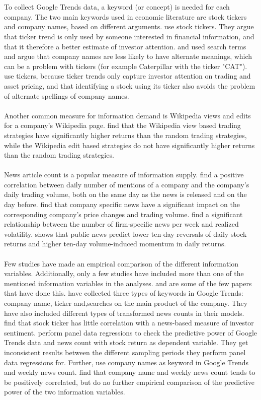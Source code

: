 \\\\
To collect Google Trends data, a keyword (or concept) is needed for each company. The two main keywords used in economic literature are stock tickers and company names, based on different arguments. \cite{joseph} use stock tickers. They argue that ticker trend is only used by someone interested in financial information, and that it therefore a better estimate of investor attention. \cite{bijl} and \cite{vlastakis} used search terms and argue that company names are less likely to have alternate meanings, which can be a problem with tickers (for example Caterpillar with the ticker "CAT"). \cite{engelberg} use tickers, because ticker trends only capture investor attention on trading and asset pricing, and that identifying a stock using its ticker also avoids the problem of alternate spellings of company names.
\\\\
Another common measure for information demand is Wikipedia views and edits for a company's Wikipedia page. \cite{moat} find that the Wikipedia view based trading strategies have significantly higher returns than the random trading strategies, while the Wikipedia edit based strategies do not have significantly higher returns than the random trading strategies. 
\\\\
News article count is a popular measure of information supply. \cite{preis2013} find a positive correlation between daily number of mentions of a company and the company's daily trading volume, both on the same day as the news is released and on the day before. \cite{ryan} find that company specific news have a significant impact on the corresponding company's price changes and trading volume. \cite{vlastakis} find a significant relationship between the number of firm-specific news per week and realized volatility. \cite{tetlock} shows that public news predict lower ten-day reversals of daily stock returns and higher ten-day volume-induced momentum in daily returns. 
\\\\
Few studies have made an empirical comparison of the different information variables. Additionally, only a few studies have included more than one of the mentioned information variables in the analyses. \cite{vlastakis} and \cite{engelberg} are some of the few papers that have done this. \cite{engelberg} have collected three types of keywords in Google Trends: company name, ticker and,searches on the main product of the company. They have also included different types of transformed news counts in their models. \cite{engelberg} find that stock ticker has little correlation with a news-based measure of investor sentiment. \cite{engelberg} perform panel data regressions to check the predictive power of Google Trends data and news count with stock return as dependent variable. They get inconsistent results between the different sampling periods they perform panel data regressions for. Further, \cite{vlastakis} use company names as keyword in Google Trends and weekly news count. \cite{vlastakis} find that company name and weekly news count tends to be positively correlated, but do no further empirical comparison of the predictive power of the two information variables. 
